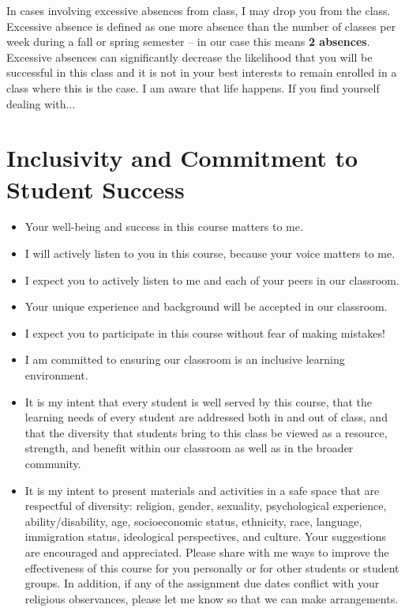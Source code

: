 \documentclass{exam}
\begin{document}
In cases involving excessive absences from class, I may drop you from the class. Excessive absence is defined as one more absence than the number of classes per week during a fall or spring semester – in our case this means \textbf{2 absences}. Excessive absences can significantly decrease the likelihood that you will be successful in this class and it is not in your best interests to remain enrolled in a class where this is the case. I am aware that life happens. If you find yourself dealing with...

\section*{Inclusivity and Commitment to Student Success}

\begin{itemize}
    \item Your well-being and success in this course matters to me.
    \item I will actively listen to you in this course, because your voice matters to me.
    \item I expect you to actively listen to me and each of your peers in our classroom.
    \item Your unique experience and background will be accepted in our classroom.
    \item I expect you to participate in this course without fear of making mistakes!
    \item I am committed to ensuring our classroom is an inclusive learning environment.
    \item It is my intent that every student is well served by this course, that the learning needs of every student are addressed both in and out of class, and that the diversity that students bring to this class be viewed as a resource, strength, and benefit within our classroom as well as in the broader community.
    \item It is my intent to present materials and activities in a safe space that are respectful of diversity: religion, gender, sexuality, psychological experience, ability/disability, age, socioeconomic status, ethnicity, race, language, immigration status, ideological perspectives, and culture. Your suggestions are encouraged and appreciated. Please share with me ways to improve the effectiveness of this course for you personally or for other students or student groups. In addition, if any of the assignment due dates conflict with your religious observances, please let me know so that we can make arrangements.
\end{itemize}
\end{document}
